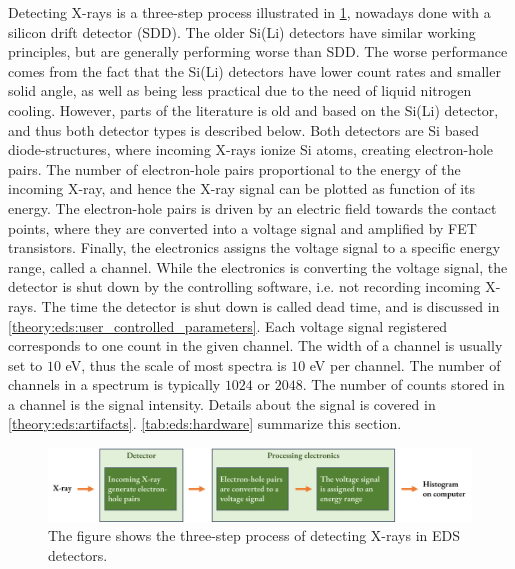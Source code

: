 Detecting X-rays is a three-step process illustrated in \cref{fig:detecting_xrays}, nowadays done with a silicon drift detector (SDD).
The older Si(Li) detectors have similar working principles, but are generally performing worse than SDD.
The worse performance comes from the fact that the Si(Li) detectors have lower count rates and smaller solid angle, as well as being less practical due to the need of liquid nitrogen cooling.
However, parts of the literature is old and based on the Si(Li) detector, and thus both detector types is described below.
Both detectors are Si based diode-structures, where incoming X-rays ionize Si atoms, creating electron-hole pairs.
The number of electron-hole pairs proportional to the energy of the incoming X-ray, and hence the X-ray signal can be plotted as function of its energy.
The electron-hole pairs is driven by an electric field towards the contact points, where they are converted into a voltage signal and amplified by FET transistors.
Finally, the electronics assigns the voltage signal to a specific energy range, called a channel.
While the electronics is converting the voltage signal, the detector is shut down by the controlling software, i.e. not recording incoming X-rays.
The time the detector is shut down is called dead time, and is discussed in \cref{theory:eds:user_controlled_parameters}.
Each voltage signal registered corresponds to one count in the given channel.
The width of a channel is usually set to $10$ eV, thus the scale of most spectra is $10$ eV per channel.
The number of channels in a spectrum is typically $1024$ or $2048$.
The number of counts stored in a channel is the signal intensity.
Details about the signal is covered in \cref{theory:eds:artifacts}.
\cref{tab:eds:hardware} summarize this section.


\begin{figure}[ht]
    \centering
    \includegraphics[width=0.99\linewidth]{figures/detecting_xrays.png}
    \caption{
        The figure shows the three-step process of detecting X-rays in EDS detectors.
    }
    \label{fig:detecting_xrays}
\end{figure}




